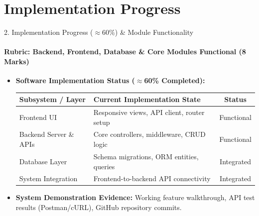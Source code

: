 \documentclass[aspectratio=169, 11pt]{beamer}
\begin{document}
\section{Implementation Progress}
\begin{frame}{2. Implementation Progress ($\approx$60\%) \& Module Functionality}
    \framesubtitle{Rubric: Backend, Frontend, Database \& Core Modules Functional (8 Marks)}
    \begin{itemize}
        \item \textbf{Software Implementation Status ($\approx$60\% Completed):}
        \begin{table}
            \centering
            \footnotesize
            \renewcommand{\arraystretch}{1.1}
            \begin{tabular}{p{3.5cm} p{4.5cm} c}
                \toprule
                \textbf{Subsystem / Layer} & \textbf{Current Implementation State} & \textbf{Status} \\
                \midrule
                Frontend UI & Responsive views, API client, router setup & Functional \\
                Backend Server \& APIs & Core controllers, middleware, CRUD logic & Functional \\
                Database Layer & Schema migrations, ORM entities, queries & Integrated \\
                System Integration & Frontend-to-backend API connectivity & Integrated \\
                \bottomrule
            \end{tabular}
        \end{table}
        \item \textbf{System Demonstration Evidence:} Working feature walkthrough, API test results (Postman/cURL), GitHub repository commits.
    \end{itemize}
\end{frame}

\end{document}
